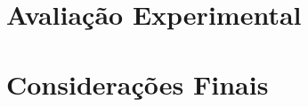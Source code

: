 \documentclass[
    12pt,       %
    oneside,    %
    a4paper,    %
%
    chapter=TITLE,	  	  %
%
    english,			  %
    brazil				  %
%
]{abntex2}
\begin{document}
\chapter{Avaliação Experimental}\label{ch:resultados}


\chapter{Considerações Finais}\label{ch:consideracoes}


% 

%
\renewcommand{\bibname}{Referências}



\printindex
\end{document}
